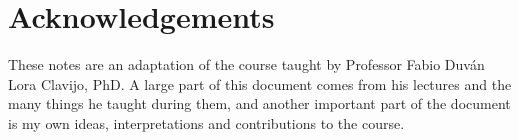 \section*{Acknowledgements}

    These notes are an adaptation of the course taught by Professor Fabio Duván Lora Clavijo, PhD. A large part of this document comes from his lectures and the many things he taught during them, and another important part of the document is my own ideas, interpretations and contributions to the course.
